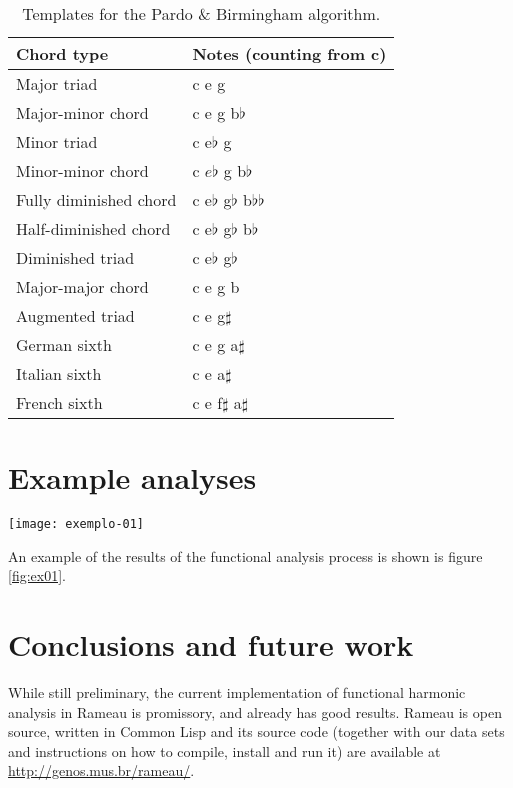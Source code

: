 \begin{table}[h]
  \centering
  \begin{small}
    \begin{sc}
      \begin{tabular}[t]{ll} \hline
        Chord type & Notes (counting from c) \\ \hline
        Major triad & c e g \\
        Major-minor chord &  c e g b$\flat$ \\
        Minor triad & c e$\flat$ g \\
        Minor-minor chord & c $e\flat$ g b$\flat$ \\
        Fully diminished chord & c e$\flat$ g$\flat$ b$\flat\flat$ \\
        Half-diminished chord & c e$\flat$ g$\flat$ b$\flat$ \\
        Diminished triad & c e$\flat$ g$\flat$ \\
        Major-major chord & c e g b \\
        Augmented triad & c e g$\sharp$ \\
        German sixth  & c e g a$\sharp$ \\
        Italian sixth & c e a$\sharp$ \\
        French sixth & c e f$\sharp$ a$\sharp$ \\ \hline
      \end{tabular}
    \end{sc}
  \end{small}
  \caption{Templates for the Pardo \& Birmingham algorithm.}
  \label{tab:templates-pardo}
\end{table}

\section{Example analyses}
\label{sec:example-analyses}

\begin{figure*}[t]
  \centering
  \texttt{[image: exemplo-01]}
  \caption{An excerpt of the analysis of Bach chorale \#20.}
  \label{fig:ex01}
\end{figure*}

An example of the results of the functional analysis process is shown
is figure \ref{fig:ex01}.

\section{Conclusions and future work}
\label{sec:concl-future-work}

While still preliminary, the current implementation of functional
harmonic analysis in Rameau is promissory, and already has good
results. Rameau is open source, written in Common Lisp and its source
code (together with our data sets and instructions on how to compile,
install and run it) are available at
\url{http://genos.mus.br/rameau/}.

